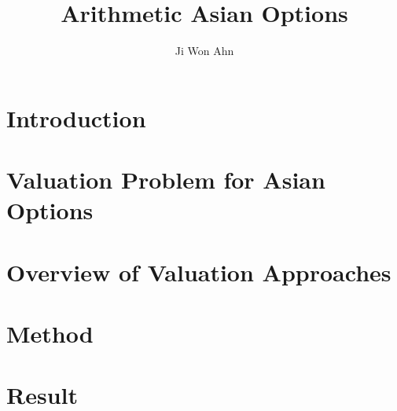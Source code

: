 \documentclass{article}
\title{Arithmetic Asian Options}
\author{Ji Won Ahn}
\date{}
\begin{document}
\maketitle

\section{Introduction}


\section{Valuation Problem for Asian Options}


\section{Overview of Valuation Approaches}


\section{Method}

\section{Result}

% 

\newpage

\printbibliography
\end{document}
